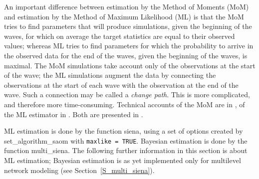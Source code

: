 \documentclass[a4paper,fleqn,11pt]{article}
\newcommand{\+}{\, + \,}
\newcommand{\sfn}[1]{\textsf{#1}}
\begin{document}
An important difference between estimation by the Method of Moments (MoM)
and estimation by the Method of Maximum Likelihood (ML) is that
the MoM tries to find parameters that will produce simulations,
given the beginning of the waves, for which
on average the target statistics are equal to their observed values;
whereas ML tries to find parameters for which the probability to arrive
in the observed data for the end of the waves, given the beginning
of the waves, is maximal. The MoM simulations take account only of the
observations at the start of the wave; the ML simulations
augment the data by connecting the
observations at the start of each wave with the observation at the end of the wave.
Such a connection may be called a \emph{change path}.
This is more complicated, and therefore more time-consuming.
Technical accounts of the MoM are in \citet{Snijders01,SnijdersEA07},
of the ML estimator in \citet{SnijdersEA10a}.
Both are presented in \citet{Snijders2017}.
\bigskip

ML estimation is done by the function \sfn{siena}, using a set of options
created by \sfn{set\_algorithm\_saom} with \texttt{maxlike = TRUE}.
Bayesian estimation is done by the function \sfn{multi\_siena}.
The following further information in this section is about ML estimation;
Bayesian estimation is as yet implemented only for multilevel network modeling
(see Section~\ref{S_multi_siena}).
\end{document}
